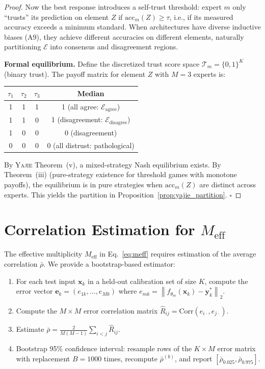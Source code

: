 \documentclass[11pt,a4paper]{article}
\theoremstyle{definition}
\newcommand{\Yajie}{\textsc{Yajie}}
\newcommand{\norm}[1]{\left\lVert#1\right\rVert}
\begin{document}
\begin{proof}
Now the best response introduces a self-trust threshold: expert $m$ only ``trusts'' its prediction on element $Z$ if $\mathrm{acc}_m(Z) \geq \tau$, i.e., if its measured accuracy exceeds a minimum standard. When architectures have diverse inductive biases (A9), they achieve different accuracies on different elements, naturally partitioning $\mathcal{E}$ into consensus and disagreement regions.

\textbf{Formal equilibrium.} Define the discretized trust score space $\mathcal{T}_m = \{0, 1\}^K$ (binary trust). The payoff matrix for element $Z$ with $M=3$ experts is:

\begin{center}
\begin{tabular}{ccc|c}
$\tau_1$ & $\tau_2$ & $\tau_3$ & Median \\
\hline
1 & 1 & 1 & 1 (all agree: $\mathcal{E}_{\mathrm{agree}}$) \\
1 & 1 & 0 & 1 (disagreement: $\mathcal{E}_{\mathrm{disagree}}$) \\
1 & 0 & 0 & 0 (disagreement) \\
0 & 0 & 0 & 0 (all distrust: pathological) \\
\end{tabular}
\end{center}

By \Yajie{} Theorem~(v), a mixed-strategy Nash equilibrium exists. By Theorem~(iii) (pure-strategy existence for threshold games with monotone payoffs), the equilibrium is in pure strategies when $\mathrm{acc}_m(Z)$ are distinct across experts. This yields the partition in Proposition~\ref{prop:yajie_partition}. $\square$
\end{proof}

\section{Correlation Estimation for $M_{\mathrm{eff}}$}
\label{sec:app_correlation}

The effective multiplicity $M_{\mathrm{eff}}$ in Eq.~\eqref{eq:meff} requires estimation of the average correlation $\bar{\rho}$. We provide a bootstrap-based estimator:

\begin{enumerate}
    \item For each test input $\mathbf{x}_k$ in a held-out calibration set of size $K$, compute the error vector $\mathbf{e}_k = (e_{1k}, \ldots, e_{Mk})$ where $e_{mk} = \norm{f_{\theta_m}(\mathbf{x}_k) - \mathbf{y}_k^*}_2$.
    \item Compute the $M \times M$ error correlation matrix $\hat{R}_{ij} = \mathrm{Corr}(e_{i\cdot}, e_{j\cdot})$.
    \item Estimate $\bar{\rho} = \frac{2}{M(M-1)}\sum_{i<j} \hat{R}_{ij}$.
    \item Bootstrap 95\% confidence interval: resample rows of the $K \times M$ error matrix with replacement $B = 1000$ times, recompute $\bar{\rho}^{(b)}$, and report $[\bar{\rho}_{0.025}, \bar{\rho}_{0.975}]$.
\end{enumerate}
\end{document}
